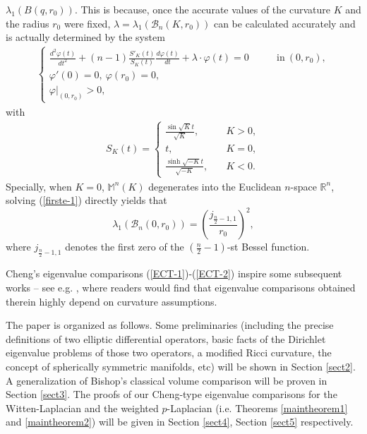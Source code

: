 \documentclass[12pt]{article}
\begin{document}
$\lambda_{1}(B(q,r_0))$. This is because, once the accurate values
of the curvature $K$ and the radius $r_0$ were fixed,
$\lambda=\lambda_{1}\left(\mathcal{B}_{n}(K,r_0)\right)$ can be
calculated accurately and is actually determined by the system
\begin{eqnarray} \label{firste-1}
\left\{
\begin{array}{lll}
\frac{d^{2}\varphi(t)}{dt^{2}}+(n-1)\frac{S'_{K}(t)}{S_{K}(t)}\frac{d\varphi(t)}{dt}+\lambda\cdot\varphi(t)=0 \qquad &\mathrm{in}~\left(0,r_0\right),  \\[1mm]
\varphi'(0)=0,~\varphi\left(r_0\right)=0, \\[0.5mm]
 \varphi|_{(0,r_0)}>0,
\end{array} \right.
\end{eqnarray}
with
\begin{eqnarray*}
S_{K}(t)=\left\{
\begin{array}{llll}
\frac{\sin\sqrt{K}t}{\sqrt{K}}, & \quad K>0,\\
 t, & \quad K=0, \\
\frac{\sinh\sqrt{-K}t}{\sqrt{-K}}, & \quad K<0.
\end{array}
\right.
\end{eqnarray*}
Specially, when $K=0$, $\mathbb{M}^{n}(K)$ degenerates into the
Euclidean $n$-space $\mathbb{R}^n$, solving (\ref{firste-1})
directly yields that
$$\lambda_{1}\left(\mathcal{B}_{n}(0,r_0)\right)=\left(\frac{j_{\frac{n}{2}-1,1}}{r_0}\right)^{2},$$
where $j_{\frac{n}{2}-1,1}$ denotes the first zero of the
$\left(\frac{n}{2}-1\right)$-st Bessel function.

Cheng's eigenvalue comparisons (\ref{ECT-1})-(\ref{ECT-2}) inspire
some subsequent works -- see e.g. \cite{DDMZ, FMI,  JM4, JM-1, SAG,
YWMD}, where readers would find that eigenvalue comparisons obtained
therein highly depend on curvature assumptions.

The paper is organized as follows. Some preliminaries (including the
precise definitions of two elliptic differential operators, basic
facts of the Dirichlet eigenvalue problems of those two operators, a
modified Ricci curvature, the concept of spherically symmetric
manifolds, etc) will be shown in Section \ref{sect2}. A
generalization of Bishop's classical volume comparison will be
proven in Section \ref{sect3}. The proofs of our Cheng-type
eigenvalue comparisons for the Witten-Laplacian and the weighted
$p$-Laplacian (i.e. Theorems \ref{maintheorem1} and
\ref{maintheorem2}) will be given in Section \ref{sect4}, Section
\ref{sect5} respectively.
\end{document}
